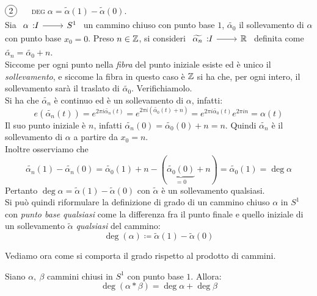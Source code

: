 \begin{observe}$\circled{2}\quad$ \textsc{$\deg\alpha = \widetilde{\alpha}(1)- \widetilde{\alpha}(0)$.}\\
	Sia $\funz \alpha I {S^1}$ un cammino chiuso con punto base $1$, $\widetilde{\alpha_0}$ il sollevamento di $\alpha$ con punto base $x_0=0$. Preso $n\in\mathbb{Z}$, si consideri $\funz {\widetilde{\alpha_n}} I \realset$ definita come $\widetilde{\alpha_n}=\widetilde{\alpha_0}+n$.\\
	Siccome per ogni punto nella \textit{fibra} del punto iniziale esiste ed è unico il \textit{sollevamento}, e siccome la fibra in questo caso è $\mathbb{Z}$ si ha che, per ogni intero, il sollevamento sarà il traslato di $\widetilde{\alpha_0}$. Verifichiamolo.\\
	Si ha che $\widetilde{\alpha_n}$ è continuo ed è un sollevamento di $\alpha$, infatti:
		\begin{equation*}
			e\left( \widetilde{\alpha_n}(t) \right)= e^{2\pi i \widetilde{\alpha_n}(t)}= e^{2\pi i (\widetilde{\alpha_0}(t)+n)}=e^{2\pi i \widetilde{\alpha_0}(t)} e^{2\pi i n}=\alpha(t)
		\end{equation*}
	Il suo punto iniziale è $n$, infatti $\widetilde{\alpha_n}(0)=\widetilde{\alpha_0}(0)+n=n$.	Quindi $\widetilde{\alpha_n}$ è il sollevamento di $\alpha$ a partire da $x_0=n$.\\
	Inoltre osserviamo che 
		\begin{equation*}
			\widetilde{\alpha_n}(1)- \widetilde{\alpha_n}(0)=\widetilde{\alpha_0}(1)+n - (\underbrace{\widetilde{\alpha_0}(0)}_{=0}+n)= \widetilde{\alpha_0}(1)=\deg\alpha
		\end{equation*}
	Pertanto $\deg\alpha= \widetilde{\alpha}(1)-\widetilde{\alpha}(0)$ con $\widetilde{\alpha}$ è un sollevamento qualsiasi.\\
	Si può quindi riformulare la definizione di grado di un cammino chiuso $\alpha$ in $S^1$ con \textit{punto base qualsiasi} come la differenza fra il punto finale e quello iniziale di un sollevamento $\widetilde{\alpha}$ \textit{qualsiasi} del cammino:
	\begin{equation}
		\deg (\alpha)\coloneqq \widetilde{\alpha}(1)-\widetilde{\alpha}(0)
	\end{equation}
\vspace{-6mm}
\end{observe}
Vediamo ora come si comporta il grado rispetto al prodotto di cammini.
\begin{theorema}
	Siano $\alpha,\ \beta$ cammini chiusi in $S^1$ con punto base $1$. Allora:
	\begin{equation}
		\deg(\alpha\ast\beta)=\deg\alpha +\deg\beta
	\end{equation}
\vspace{-6mm}
\end{theorema}
